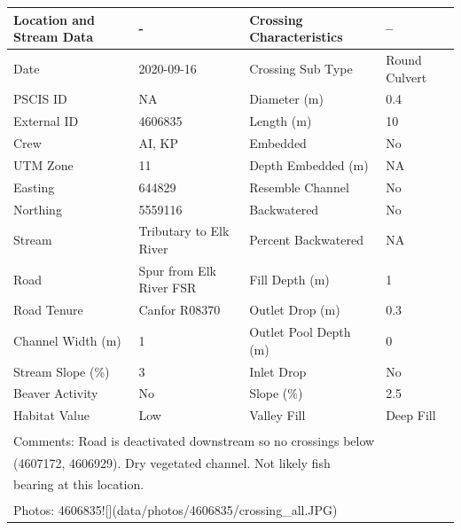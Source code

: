 \documentclass[
]{book}
\begin{document}
\begin{tabular}{l|l|l|l}
\hline
Location and Stream Data & - & Crossing Characteristics & --\\
\hline
Date & 2020-09-16 & Crossing Sub Type & Round Culvert\\
\hline
PSCIS ID & NA & Diameter (m) & 0.4\\
\hline
External ID & 4606835 & Length (m) & 10\\
\hline
Crew & AI, KP & Embedded & No\\
\hline
UTM Zone & 11 & Depth Embedded (m) & NA\\
\hline
Easting & 644829 & Resemble Channel & No\\
\hline
Northing & 5559116 & Backwatered & No\\
\hline
Stream & Tributary to Elk River & Percent Backwatered & NA\\
\hline
Road & Spur from Elk River FSR & Fill Depth (m) & 1\\
\hline
Road Tenure & Canfor R08370 & Outlet Drop (m) & 0.3\\
\hline
Channel Width (m) & 1 & Outlet Pool Depth (m) & 0\\
\hline
Stream Slope (\%) & 3 & Inlet Drop & No\\
\hline
Beaver Activity & No & Slope (\%) & 2.5\\
\hline
Habitat Value & Low & Valley Fill & Deep Fill\\
\hline
\multicolumn{4}{l}{\textsuperscript{} Comments: Road is deactivated downstream so no crossings below}\\
\multicolumn{4}{l}{(4607172, 4606929). Dry vegetated channel. Not likely fish}\\
\multicolumn{4}{l}{bearing at this location.}\\
\multicolumn{4}{l}{\textsuperscript{} Photos: 4606835![](data/photos/4606835/crossing\_all.JPG)}\\
\end{tabular}
\end{document}
